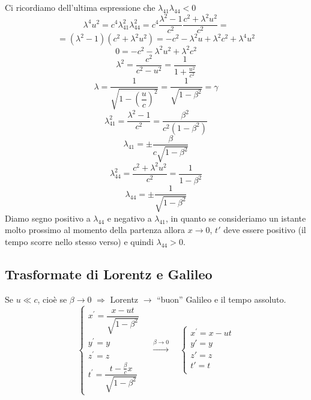 Ci ricordiamo dell'ultima espressione che $\lambda_{41}\lambda_{44}<0$
\begin{equation*}\lambda^4u^2=c^4\lambda_{41}^2\lambda_{44}^2=c^4\frac{\lambda^2-1}{c^2}\frac{c^2+\lambda^2u^2}{c^2}=\end{equation*}
\begin{equation*}=(\lambda^2-1)(c^2+\lambda^2u^2)=-c^2-\lambda^2u+\lambda^2c^2+\lambda^4u^2\end{equation*}
\begin{equation*}0=-c^2-\lambda^2u^2+\lambda^2c^2\end{equation*}
\begin{equation*}\lambda^2=\frac{c^2}{c^2-u^2}=\frac{1}{1+\frac{u^2}{c^2}}\end{equation*}
\begin{equation*}\lambda=\dfrac{1}{\sqrt{1-\left(\dfrac{u}{c}\right)^2}}=\dfrac{1}{\sqrt{1-\beta^2}}=\gamma\end{equation*}
\begin{equation*}\lambda_{41}^2=\frac{\lambda^2-1}{c^2}=\frac{\beta^2}{c^2(1-\beta^2)}\end{equation*}
\begin{equation*}\lambda_{41}=\pm\frac{\beta}{c\sqrt{1-\beta^2}}\end{equation*}
\begin{equation*}\lambda_{44}^2=\frac{c^2+\lambda^2u^2}{c^2}=\frac{1}{1-\beta^2}\end{equation*}
\begin{equation*}\lambda_{44}=\pm\frac{1}{\sqrt{1-\beta^2}}\end{equation*}
Diamo segno positivo a $\lambda_{44}$ e negativo a $\lambda_{41}$, in quanto se consideriamo un istante molto prossimo al momento della partenza allora $x\rightarrow 0$, $t'$ deve essere positivo (il tempo scorre nello stesso verso) e quindi $\lambda_{44}>0$.
\subsection{Trasformate di Lorentz e Galileo}
Se $u\ll c$, cioè se $\beta\rightarrow 0$ $\Rightarrow$ Lorentz $\rightarrow$ ``buon'' Galileo e il tempo assoluto.
\begin{equation*}\left\{
\begin{array}{l}
x^\prime=\dfrac{x-ut}{\sqrt{1-\beta^2}}\\
y^\prime=y\\
z^\prime=z\\
t^\prime=\dfrac{t-\frac{\beta}{c}x}{\sqrt{1-\beta^2}}
\end{array}\right.
\quad \stackrel{\beta\rightarrow 0}{\longrightarrow} \quad
\left\{
\begin{array}{l}
x^\prime=x-ut\\
y'=y\\
z'=z\\
t'=t\\
\end{array}\right.\end{equation*}
 

